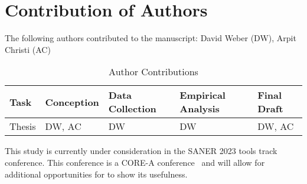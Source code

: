 
\chapter*{Contribution of Authors}
\vspace{7mm}

The following authors contributed to the manuscript: David Weber (DW), Arpit Christi (AC)

\begin{table}[h]
\caption{Author Contributions}
\begin{center}
{\scriptsize
\begin{tabular}{|l|l|l|l|l|}
\hline
Task & Conception & Data Collection & Empirical Analysis & Final Draft \\
\hline
\hline
{Thesis} & {DW, AC} & {DW} & {DW} & {DW, AC} \\
\hline

\end{tabular}
}
\end{center}
\label{contributionOfAuthors}
\end{table}

This study is currently under consideration in the SANER 2023 tools track conference. This conference is a CORE-A conference~\cite{core_conference_portal} and will allow for additional opportunities for \mytool to show its usefulness.


 